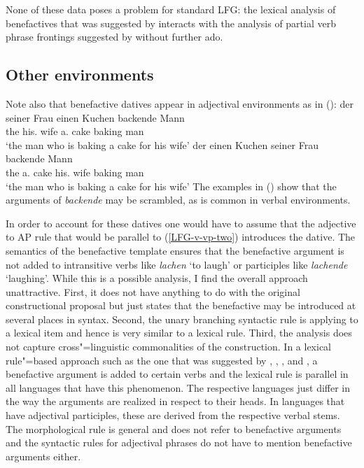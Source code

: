 None of these data poses a problem for standard LFG: the lexical analysis of benefactives that was suggested by \citet{Toivonen2013a}
interacts with the analysis of partial verb phrase frontings suggested by \citet{ZK2002a} without
further ado.

\subsection{Other environments}
\label{sec-adjectival-participles-benefactive}

Note also that benefactive datives appear in adjectival environments as in ():
\eal
\ex
\gll der seiner Frau einen Kuchen backende Mann\\
     the his.\dat{} wife a.\acc{} cake baking man\\
\glt `the man who is baking a cake for his wife'
\ex
\gll der einen Kuchen seiner Frau backende Mann\\
     the a.\acc{} cake  his.\dat{} wife baking man\\
\glt `the man who is baking a cake for his wife'
\zl
The examples in () show that the arguments of \emph{backende} may be scrambled, as is common
in verbal environments.

In order to account for these datives one would have to assume that the adjective to AP rule that
would be parallel to (\ref{LFG-v-vp-two}) introduces the dative. The semantics of the benefactive
template ensures that the benefactive argument is not added to intransitive
verbs like \emph{lachen} `to laugh' or participles like \emph{lachende} `laughing'. 
While this is a possible analysis, I find the overall approach unattractive. First, it does not have anything to do with
the original constructional proposal but just states that the benefactive may be introduced at
several places in syntax. Second, the unary branching syntactic rule is applying to a lexical
item and hence is very similar to a lexical rule. Third, the analysis does not capture cross"=linguistic commonalities of the
construction. In a lexical rule"=based approach such as the one that was suggested by
\citet[Section~5]{BC99a}, \citet{Cook2006a-u}, \citet{Kibort2008a}, and \citet{Toivonen2013a}, a
benefactive argument is added to certain verbs and the lexical rule is parallel in all languages
that have this phenomenon. The respective languages just differ in the way the arguments are
realized in respect to their heads. In languages that have adjectival participles, these are derived
from the respective verbal stems. The morphological rule is general and does not refer to benefactive
arguments and the syntactic rules for adjectival phrases do not have to mention benefactive
arguments either. 

